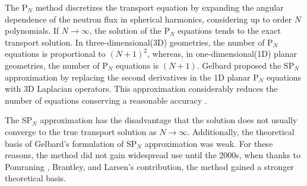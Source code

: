 \documentclass{anstrans}
\begin{document}
The P$_N$ method \cite{davidson_neutron_1957} discretizes the transport equation by expanding the angular dependence of the neutron flux in spherical harmonics, considering up to order $N$ polynomials.
If $N \rightarrow \infty$, the solution of the P$_N$ equations tends to the exact transport solution.
In three-dimensional(3D) geometries, the number of P$_N$ equations is proportional to $(N+1)^2$, whereas, in one-dimensional(1D) planar geometries, the number of P$_N$ equations is $(N+1)$.
Gelbard \cite{gelbard_spherical_1960} proposed the SP$_N$ approximation by replacing the second derivatives in the 1D planar P$_N$ equations with 3D Laplacian operators.
This approximation considerably reduces the number of equations conserving a reasonable accuracy \cite{capilla_applications_2009}.

The SP$_N$ approximation has the disadvantage that the solution does not usually converge to the true transport solution as $N \rightarrow \infty$.
Additionally, the theoretical basis of Gelbard's formulation of SP$_N$ approximation was weak.
For these reasons, the method did not gain widespread use until the 2000s, when thanks to Pomraning \cite{pomraning_asymptotic_1993}, Brantley, and Larsen's \cite{brantley_simplifiedP3_2000} contribution, the method gained a stronger theoretical basis.
\end{document}
